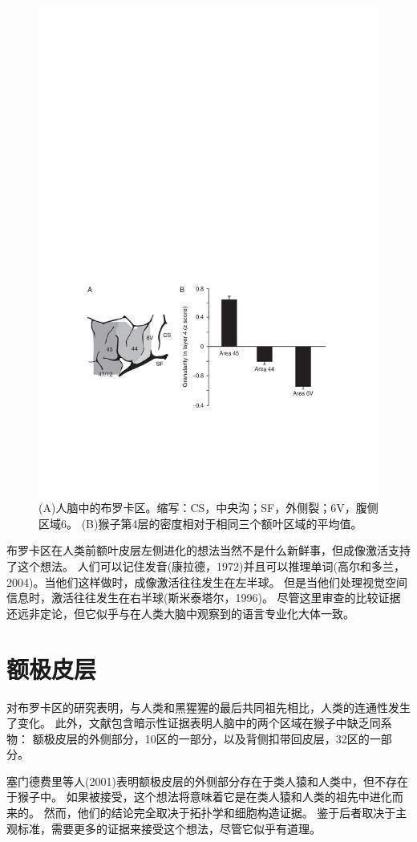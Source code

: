 \begin{figure}[!htb]
	\centering
	\includegraphics[width=0.5\linewidth]{chap9/9_3}
	\caption{(A)人脑中的布罗卡区。缩写：CS，中央沟；SF，外侧裂；6V，腹侧区域6。
		(B)猴子第4层的密度相对于相同三个额叶区域的平均值\cite{petrides2005orofacial}。\label{fig:fig_9_3}}
\end{figure}

\par

布罗卡区在人类前额叶皮层左侧进化的想法当然不是什么新鲜事，但成像激活支持了这个想法。
人们可以记住发音(康拉德，1972)并且可以推理单词(高尔和多兰，2004)。当他们这样做时，成像激活往往发生在左半球。
但是当他们处理视觉空间信息时，激活往往发生在右半球(斯米泰塔尔，1996)。
尽管这里审查的比较证据还远非定论，但它似乎与在人类大脑中观察到的语言专业化大体一致。



\section{额极皮层}
对布罗卡区的研究表明，与人类和黑猩猩的最后共同祖先相比，人类的连通性发生了变化。
此外，文献包含暗示性证据表明人脑中的两个区域在猴子中缺乏同系物：
额极皮层的外侧部分，10区的一部分，以及背侧扣带回皮层，32区的一部分。
\par


塞门德费里等人(2001)表明额极皮层的外侧部分存在于类人猿和人类中，但不存在于猴子中。
如果被接受，这个想法将意味着它是在类人猿和人类的祖先中进化而来的。
然而，他们的结论完全取决于拓扑学和细胞构造证据。
鉴于后者取决于主观标准，需要更多的证据来接受这个想法，尽管它似乎有道理。
\par


